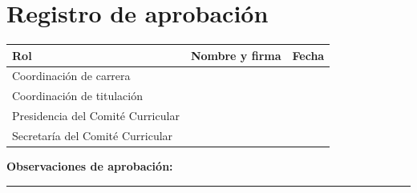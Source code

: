 \documentclass[12pt,a4paper,oneside]{report}
\begin{document}
\chapter*{Registro de aprobación}

\vspace{1cm}

\begin{longtable}{|p{4cm}|p{4cm}|p{4cm}|}
  \hline
  \textbf{Rol} & \textbf{Nombre y firma} & \textbf{Fecha} \\
  \hline
  Coordinación de carrera & & \\
  \hline
  Coordinación de titulación & & \\
  \hline
  Presidencia del Comité Curricular & & \\
  \hline
  Secretaría del Comité Curricular & & \\
  \hline
\end{longtable}

\vfill
\noindent\textbf{Observaciones de aprobación:}

\vspace{3cm}
\hrule
\end{document}
